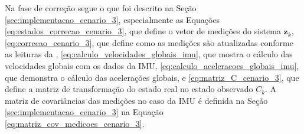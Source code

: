\documentclass[acronym, symbols, table, deposito]{fei}
\begin{document}
			Na fase de correção segue o que foi descrito na Seção \ref{sec:implementacao_cenario_3}, especialmente as Equações \eqref{eq:estados_correcao_cenario_3}, que define o vetor de medições do sistema $\textbf{z}_k$, \eqref{eq:correcao_cenario_3}, que define como as medições são atualizadas conforme as leituras da , \eqref{eq:calculo_velocidades_globais_imu}, que mostra o cálculo das velocidades globais com os dados da IMU, \eqref{eq:calculo_aceleracoes_globais_imu}, que demonstra o cálculo das acelerações globais, e \eqref{eq:matriz_C_cenario_3}, que define a matriz de transformação do estado real no estado observado $C_{k}$. A matriz de covariâncias das medições no caso da IMU é definida na Seção \ref{sec:implementacao_cenario_3} na Equação \eqref{eq:matriz_cov_medicoes_cenario_3}.
		
%		
%				
%				
\end{document}
